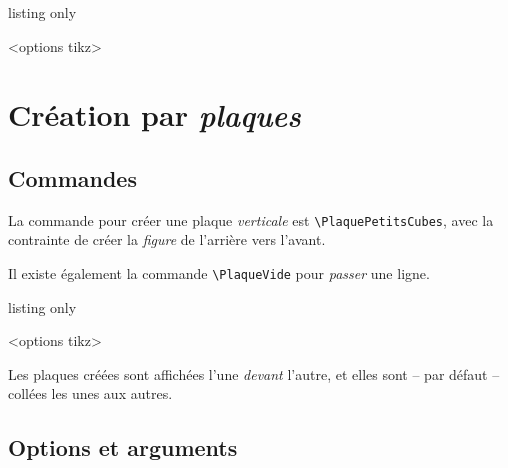 \documentclass[french,a4paper,11pt]{article}
\begin{document}
\begin{PresCodeTex}{listing only}
\begin{EmpilementCubes}[échelle]<options tikz>
\end{EmpilementCubes}
\end{PresCodeTex}

\section{Création par \textit{plaques}}

\subsection{Commandes}

\begin{cautionblock}
La commande pour créer une plaque \textit{verticale} est \texttt{\textbackslash PlaquePetitsCubes}, avec la contrainte de créer la \textit{figure} de l'arrière vers l'avant.

Il existe également la commande \texttt{\textbackslash PlaqueVide} pour \textit{passer} une ligne.
\end{cautionblock}

\begin{PresCodeTex}{listing only}
\begin{EmpilementCubes}[échelle]<options tikz>
	\PlaqueVide[nb]
\end{EmpilementCubes}
\end{PresCodeTex}

\begin{importantblock}
Les plaques créées sont affichées l'une \textit{devant} l'autre, et elles sont -- par défaut -- collées les unes aux autres.
\end{importantblock}

\subsection{Options et arguments}
\end{document}
